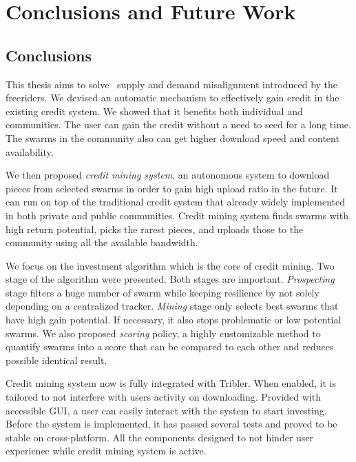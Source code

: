 \chapter{Conclusions and Future Work}
\label{chp:conclusionsandfuturework}

\section{Conclusions}
This thesis aims to solve \bt~supply and demand misalignment introduced by the freeriders. We devised an automatic mechanism to effectively gain credit in the existing credit system. We showed that it benefits both individual and communities. The user can gain the credit without a need to seed for a long time. The swarms in the community also can get higher download speed and content availability.

We then proposed \textit{credit mining system}, an autonomous system to download pieces from selected swarms in order to gain high upload ratio in the future. It can run on top of the traditional credit system that already widely implemented in both private and public communities. Credit mining system finds swarms with high return potential, picks the rarest pieces, and uploads those to the community using all the available bandwidth.

We focus on the investment algorithm which is the core of credit mining. Two stage of the algorithm were presented. Both stages are important. \textit{Prospecting} stage filters a huge number of swarm while keeping resilience by not solely depending on a centralized tracker. \textit{Mining} stage only selects best swarms that have high gain potential. If necessary, it also stops problematic or low potential swarms. We also proposed \textit{scoring} policy, a highly customizable method to quantify swarms into a score that can be compared to each other and reduces possible identical result.

Credit mining system now is fully integrated with Tribler. When enabled, it is tailored to not interfere with users activity on downloading. Provided with accessible GUI, a user can easily interact with the system to start investing. Before the system is implemented, it has passed several tests and proved to be stable on cross-platform. All the components designed to not hinder user experience while credit mining system is active.

